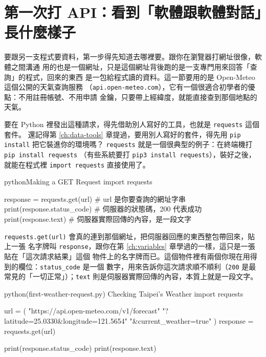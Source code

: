 \section{第一次打 API：看到「軟體跟軟體對話」長什麼樣子}
\label{sec:first-api-call}

要跟另一支程式要資料，第一步得先知道去哪裡要。跟你在瀏覽器打網址很像，軟體之間溝通
用的也是一個網址，只是這個網址背後跑的是一支專門用來回答「查詢」的程式，回來的東西
是一包給程式讀的資料。這一節要用的是 Open-Meteo 這個公開的天氣查詢服務
（\texttt{api.open-meteo.com}），它有一個很適合初學者的優點：不用註冊帳號、不用申請
金鑰，只要帶上經緯度，就能直接查到那個地點的天氣。

要在 Python 裡發出這種請求，得先借助別人寫好的工具，也就是 \texttt{requests} 這個套件。
還記得第 \ref{ch:data-tools} 章提過，要用別人寫好的套件，得先用 \texttt{pip install} 把它裝進你的環境嗎？
\texttt{requests} 就是一個很典型的例子：在終端機打 \texttt{pip install requests}
（有些系統要打 \texttt{pip3 install requests}），裝好之後，就能在程式裡
\texttt{import requests} 直接使用了。

\begin{code}{python}{Making a GET Request}
import requests

response = requests.get(url)   # url 是你要查詢的網址字串
print(response.status_code)    # 伺服器的狀態碼，200 代表成功
print(response.text)           # 伺服器實際回傳的內容，是一段文字
\end{code}

\texttt{requests.get(url)} 會真的連到那個網址，把伺服器回應的東西整包帶回來，貼上一張
名字牌叫 \texttt{response}，跟你在第 \ref{ch:variables} 章學過的一樣，這只是一張貼在「這次請求結果」這個
物件上的名字牌而已。這個物件裡有兩個你現在用得到的欄位：\texttt{status\_code} 是一個
數字，用來告訴你這次請求順不順利（\texttt{200} 是最常見的「一切正常」）；\texttt{text}
則是伺服器實際回傳的內容，本質上就是一段文字。

\begin{example}{python}{(first-weather-request.py) Checking Taipei's Weather}
import requests

url = (
    "https://api.open-meteo.com/v1/forecast"
    "?latitude=25.0330&longitude=121.5654"
    "&current_weather=true"
)
response = requests.get(url)

print(response.status_code)
print(response.text)
\end{example}


